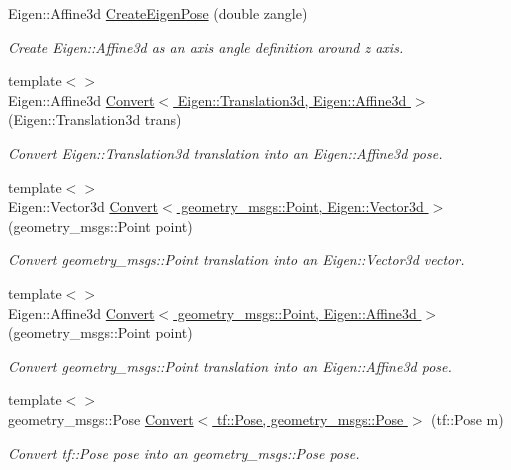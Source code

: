 \begin{DoxyCompactItemize}
Eigen\-::\-Affine3d \hyperlink{namespaceConversion_a79d77925c7f4381dca2f4587923cd849}{Create\-Eigen\-Pose} (double zangle)
\begin{DoxyCompactList}\small\item\em Create Eigen\-::\-Affine3d as an axis angle definition around z axis. \end{DoxyCompactList}\item 
{\footnotesize template$<$$>$ }\\Eigen\-::\-Affine3d \hyperlink{namespaceConversion_a13038fb5064a0b8b617e8613733203e3}{Convert$<$ Eigen\-::\-Translation3d, Eigen\-::\-Affine3d $>$} (Eigen\-::\-Translation3d trans)
\begin{DoxyCompactList}\small\item\em Convert Eigen\-::\-Translation3d translation into an Eigen\-::\-Affine3d pose. \end{DoxyCompactList}\item 
{\footnotesize template$<$$>$ }\\Eigen\-::\-Vector3d \hyperlink{namespaceConversion_a3d51933723f132b4502aeb7bcb30195b}{Convert$<$ geometry\-\_\-msgs\-::\-Point, Eigen\-::\-Vector3d $>$} (geometry\-\_\-msgs\-::\-Point point)
\begin{DoxyCompactList}\small\item\em Convert geometry\-\_\-msgs\-::\-Point translation into an Eigen\-::\-Vector3d vector. \end{DoxyCompactList}\item 
{\footnotesize template$<$$>$ }\\Eigen\-::\-Affine3d \hyperlink{namespaceConversion_a9280130c85d311a1a5416578cb974119}{Convert$<$ geometry\-\_\-msgs\-::\-Point, Eigen\-::\-Affine3d $>$} (geometry\-\_\-msgs\-::\-Point point)
\begin{DoxyCompactList}\small\item\em Convert geometry\-\_\-msgs\-::\-Point translation into an Eigen\-::\-Affine3d pose. \end{DoxyCompactList}\item 
{\footnotesize template$<$$>$ }\\geometry\-\_\-msgs\-::\-Pose \hyperlink{namespaceConversion_a51517734edff084c759524c24b337011}{Convert$<$ tf\-::\-Pose, geometry\-\_\-msgs\-::\-Pose $>$} (tf\-::\-Pose m)
\begin{DoxyCompactList}\small\item\em Convert tf\-::\-Pose pose into an geometry\-\_\-msgs\-::\-Pose pose. \end{DoxyCompactList}\item 

\end{DoxyCompactItemize}

